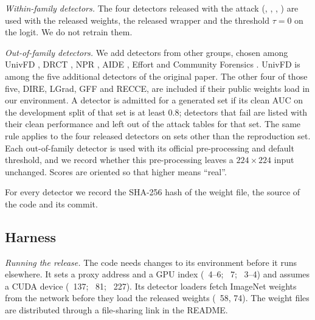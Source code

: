 \emph{Within-family detectors.} The four detectors released with the attack (\detE, \detR, \detD,
\detS) are used with the released weights, the released wrapper and the threshold $\tau=0$ on the
logit. We do not retrain them.

\emph{Out-of-family detectors.} We add detectors from other groups, chosen among UnivFD
, DRCT , NPR , AIDE
, Effort  and Community Forensics
. UnivFD is among the five additional detectors of the original
paper. The other four of those five, DIRE, LGrad, GFF and RECCE, are included if their public
weights load in our environment. 
A detector is admitted for a generated set if its clean AUC on the development split of that set
is at least 0.8; detectors that fail are listed with their clean performance and left out of the
attack tables for that set. The same rule applies to the four released detectors on sets other
than the reproduction set. Each out-of-family detector is used with its official pre-processing
and default threshold, and we record whether this pre-processing leaves a $224\times224$ input
unchanged. Scores are oriented so that higher means ``real''.

For every detector we record the SHA-256 hash of the weight file, the source of the code and its
commit.

\subsection{Harness}
\label{sec:harness}

\emph{Running the release.} The code needs changes to its environment before it runs elsewhere. It
sets a proxy address and a GPU index (~\mbox{4--6}; ~7; ~\mbox{3--4}) and assumes a
CUDA device (~137; ~81; ~227). Its detector loaders fetch ImageNet
weights from the network before they load the released weights (~58, 74). The weight
files are distributed through a file-sharing link in the README.

